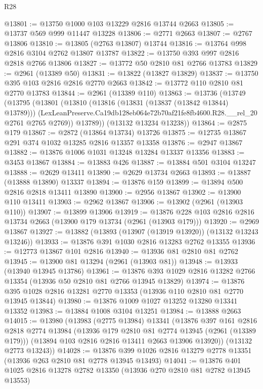 \begin{lexlean}{R28}
\begin{coremodule}
@13801 := @13750 @1000 @103 @13229 @2816 @13744 @2663
@13805 := @13737 @569 @999 @11447 @13228
@13806 := @2771 @2663
@13807 := @2767 @13806
@13810 := @13805 (@2763 @13807) @13744
@13816 := @13764 @998 @2816 @3104 @2762 @13807 @13787
@13822 := @13750 @393 @997 @2816 @2818 @2766 @13806
@13827 := @13772 @50 @2810 @81 @2766 @13783
@13829 := @2961 (@13389 @50)
@13831 := @13822 (@13827 @13829)
@13837 := @13750 @395 @103 @2816 @2816 @2770 @2663
@13842 := @13772 @110 @2810 @81 @2770 @13783
@13844 := @2961 (@13389 @110)
@13863 := @13736
    (@13749
      (@13795
        (@13801
          (@13810
            (@13816 (@13831 (@13837 (@13842 @13844) @13789)))
            (LexLeanPreserve.Ca19db128eb064e72b70af21fe8fb4600.R28.__rel_20 @2761 @2765 @2769))
          @13789))
      (@13132 @13234 @13238))
@13864 := @2875 @179
@13867 := @2872 (@13864 @13734) @13726
@13875 := @12735 @13867 @291 @374 @1032 @13285 @2816 @13357 @13358
@13876 := @2947 @13867
@13882 := @13876 @1006 @1031 @13248 @13284 @13337 @13356
@13883 := @3453 @13867
@13884 := @13883 @426
@13887 := @13884 @501 @3104 @13247
@13888 := @2629 @13411
@13890 := @2629 @13734 @2663
@13893 := @13887 (@13888 @13890) @13337
@13894 := @13876 @159
@13899 := @13894 @500 @2816 @2818 @13411 @13890
@13900 := @2956 @13867
@13902 := @13900 @110 @13411
@13903 := @2962 @13867
@13906 := @13902 (@2961 (@13903 @110))
@13907 := @13899 @13906
@13919 := @13876 @228 @103 @2816 @2816 @13734 @2663 (@13900 @179 @13734 (@2961 (@13903 @179)))
@13920 := @2969 @13867
@13927 := @13882 (@13893 (@13907 (@13919 @13920)) (@13132 @13243 @13246))
@13933 := @13876 @391 @1030 @2816 @13283 @2762 @13355
@13936 := @12773 @13867 @101 @2816
@13940 := @13936 @81 @2810 @81 @2762
@13945 := @13900 @81 @13294 (@2961 (@13903 @81))
@13948 := @13933 (@13940 @13945 @13786)
@13961 := @13876 @393 @1029 @2816 @13282 @2766 @13354 (@13936 @50 @2810 @81 @2766 @13945 @13829)
@13974 := @13876 @395 @1028 @2816 @13281 @2770 @13353 (@13936 @110 @2810 @81 @2770 @13945 @13844)
@13980 := @13876 @1009 @1027 @13252 @13280 @13341 @13352
@13983 := @13884 @1008 @3104 @13251
@13984 := @13888 @2663
@14015 := @13980
    (@13983
      (@2775 @13984)
      @13341
      (@13876
        @397
        @161
        @2816
        @2818
        @2774
        @13984
        (@13936 @179 @2810 @81 @2774 @13945 (@2961 (@13389 @179)))
        (@13894 @103 @2816 @2816 @13411 @2663 @13906 @13920))
      (@13132 @2773 @13243))
@14028 := @13876 @399 @1026 @2816 @13279 @2778 @13351 (@13936 @263 @2810 @81 @2778 @13945 @13493)
@14041 := @13876 @401 @1025 @2816 @13278 @2782 @13350 (@13936 @270 @2810 @81 @2782 @13945 @13553)

\end{coremodule}
\end{lexlean}

